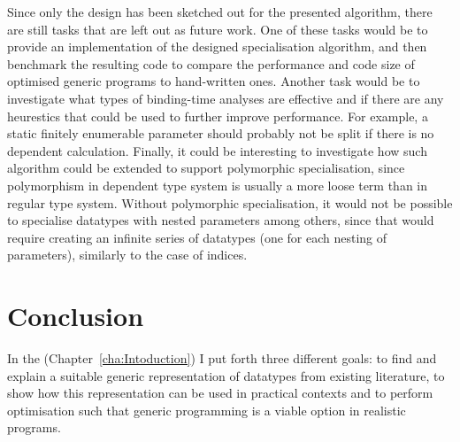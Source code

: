 \documentclass{ituthesis}
\theoremstyle{break}
\begin{document}
Since only the design has been sketched out for the presented algorithm, there are still tasks that are left out as future work.
One of these tasks would be to provide an implementation of the designed specialisation algorithm, and then benchmark the resulting code to compare the performance and code size of optimised generic programs to hand-written ones.
Another task would be to investigate what types of binding-time analyses are effective and if there are any heurestics that could be used to further improve performance.
For example, a static finitely enumerable parameter should probably not be split if there is no dependent calculation.
Finally, it could be interesting to investigate how such algorithm could be extended to support polymorphic specialisation, since polymorphism in dependent type system is usually a more loose term than in regular type system.
Without polymorphic specialisation, it would not be possible to specialise datatypes with nested parameters among others, since that would require creating an infinite series of datatypes (one for each nesting of parameters), similarly to the case of indices.





\chapter{Conclusion}
\label{cha:Conclusion}
In the  (Chapter~\ref{cha:Intoduction}) I put forth three different goals: to find and explain a suitable generic representation of datatypes from existing literature, to show how this representation can be used in practical contexts and to perform optimisation such that generic programming is a viable option in realistic programs.
\end{document}
